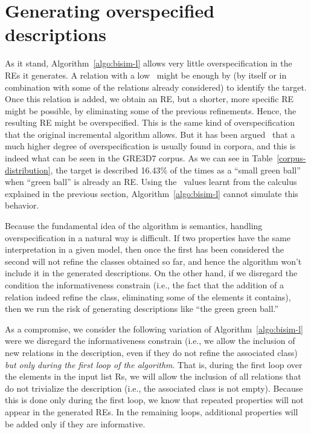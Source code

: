 \section{Generating overspecified descriptions} 
\label{sec:overspecification}

As it stand, Algorithm~\ref{algo:bisim-l} allows very little overspecification in the REs it
generates.  A relation with a low \puse\ might be enough by 
(by itself or in combination with some of the relations already considered) to 
identify the target. Once this relation is added, we obtain an RE, but a shorter, 
more specific RE might be possible, by eliminating some of the previous refinements. 
Hence, the resulting RE might be overspecified. This is the same kind of overspecification 
that the original incremental algorithm allows.  But it has been argued~\cite{Engelhardt_Bailey_Ferreira_2006,Arts_Maes_Noordman_Jansen_2011} that 
a much higher degree of overspecification is usually found in corpora, and this 
is indeed what can be seen in the GRE3D7 corpus.  As we can see in Table~\ref{corpus-distribution}, 
the target is described 16.43\% of the times as a ``small green ball'' when ``green 
ball'' is already an RE.  Using the \puse\ values learnt from the calculus explained
in the previous section, Algorithm~\ref{algo:bisim-l} cannot simulate this behavior. 

Because the fundamental idea of the algorithm is semantics, handling overspecification in 
a natural way is difficult. If two properties have the same interpretation in a given 
model, then once the first has been considered the second will not refine the classes 
obtained so far, and hence the algorithm won't include it in the generated descriptions. 
On the other hand, if we disregard the condition the informativeness constrain (i.e., 
the fact that the addition of a relation indeed refine the class, eliminating some of 
the elements it contains), then we run the risk of generating descriptions like ``the green 
green ball.''

As a compromise, we consider the following variation of Algorithm~\ref{algo:bisim-l} were 
we disregard the informativeness constrain (i.e., we allow the inclusion of new relations 
in the description, even if they do not refine the associated class) \emph{but only during the 
first loop of the algorithm}.  That is, during the first loop over the elements in the 
input list Rs, we will allow the inclusion of all relations that do not trivialize the 
description (i.e., the associated class is not empty).  Because this is done only during 
the first loop, we know that repeated properties will not appear in the generated REs.  
In the remaining loops, additional properties will be added only if they are informative. 

